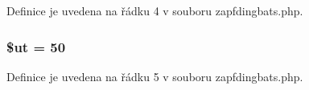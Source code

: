 Definice je uvedena na řádku 4 v souboru zapfdingbats.\-php.

\hypertarget{zapfdingbats_8php_aadd3f841051043ee58e587e840e8dd0b}{
\subsubsection[{\$ut}]{\setlength{\rightskip}{0pt plus 5cm}\$ut = 50}}\label{zapfdingbats_8php_aadd3f841051043ee58e587e840e8dd0b}


Definice je uvedena na řádku 5 v souboru zapfdingbats.\-php.


